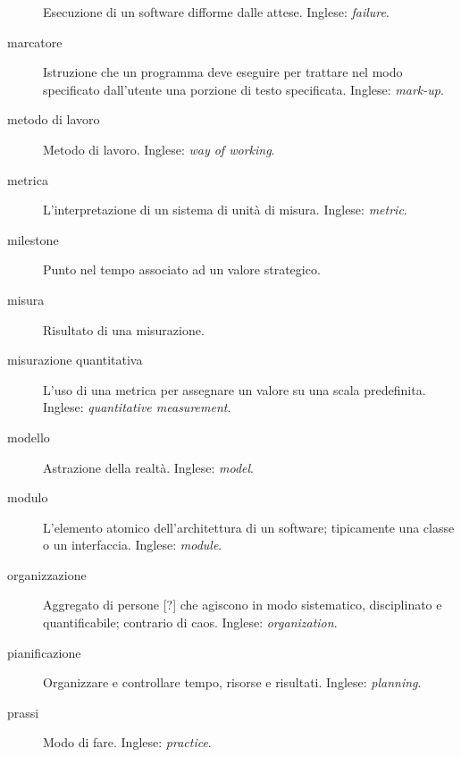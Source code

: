 \documentclass[a4paper]{article}
\begin{document}
\begin{description}
			Esecuzione di un software difforme dalle attese. Inglese: \emph{failure}.
			
	\item[marcatore] 

			Istruzione che un programma deve eseguire per trattare nel modo specificato dall'utente una porzione di testo specificata. Inglese: \emph{mark-up}.
			
	\item[metodo di lavoro] 

			Metodo di lavoro. Inglese: \emph{way of working}.
			
	\item[metrica] 

			L'interpretazione di un sistema di unità di misura. Inglese: \emph{metric}.
			
	\item[milestone] 

			Punto nel tempo associato ad un valore strategico.
			
	\item[misura] 

			Risultato di una misurazione.
			
	\item[misurazione quantitativa] 

			L'uso di una metrica per assegnare un valore su una scala predefinita. Inglese: \emph{quantitative measurement}.
			
	\item[modello] 

			Astrazione della realtà. Inglese: \emph{model}.
			
	\item[modulo] 

			L'elemento atomico dell'architettura di un software; tipicamente una classe o un interfaccia. Inglese: \emph{module}.
			
	\item[organizzazione] 

			Aggregato di persone [?] che agiscono in modo sistematico, disciplinato e quantificabile; contrario di caos. Inglese: \emph{organization}.
			
	\item[pianificazione] 

			Organizzare e controllare tempo, risorse e risultati. Inglese: \emph{planning}.
			
	\item[prassi] 

			Modo di fare. Inglese: \emph{practice}.
			

\end{description}
\end{document}
